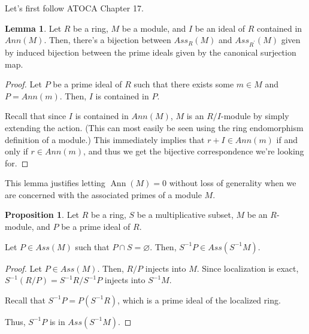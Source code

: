 \documentclass{article}
\theoremstyle{definition}
\newtheorem{lemma}[theorem]{Lemma}
\newtheorem{proposition}[theorem]{Proposition}
\newcommand{\ann}{\operatorname{Ann}}
\begin{document}
Let's first follow ATOCA Chapter 17.

\begin{lemma}
    Let $ R $ be a ring, $ M $ be a module, and $ I $ be an ideal of $ R $
    contained in $ Ann(M) $. Then, there's a bijection between $ Ass_{R}(M) $
    and $ Ass_{R^{\prime}}(M) $ given by induced bijection between the prime
    ideals given by the canonical surjection map.
\end{lemma}
\begin{proof}
    Let $ P $ be a prime ideal of $ R $ such that there exists some $ m \in M $
    and $ P = Ann(m) $. Then, $ I $ is contained in $ P $.

    Recall that since $ I $ is contained in $ Ann(M) $,
    $ M $ is an $ R/I $-module by simply extending the action.
    (This can most easily be seen using the ring endomorphism definition
    of a module.)
    This immediately implies that $ r + I \in Ann(m) $ if and only if $ r \in Ann(m) $,
    and thus we get the bijective correspondence we're looking for.
\end{proof}

This lemma justifies letting $ \ann(M) = 0 $ without loss of generality
when we are concerned with the associated primes of a module $ M $.

\begin{proposition}
    Let $ R $ be a ring, $ S $ be a multiplicative subset, $ M $ be an $ R $-module,
    and $ P $ be a prime ideal of $ R $.

    Let $ P \in Ass(M) $ such that $ P \cap S = \varnothing $.
    Then, $ S^{-1}P \in Ass(S^{-1}M) $.
\end{proposition}
\begin{proof}
    Let $ P \in Ass(M) $.
    Then, $ R/P $ injects into $ M $.
    Since localization is exact, $ S^{-1}(R/P) = S^{-1}R / S^{-1}P $
    injects into $ S^{-1}M $.

    Recall that $ S^{-1}P = P (S^{-1}R) $, which is a prime ideal of
    the localized ring.

    Thus, $ S^{-1}P $ is in $ Ass(S^{-1}M) $.
\end{proof}





\end{document}
